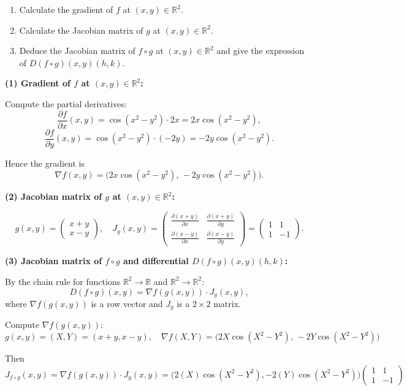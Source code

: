 \documentclass[12pt]{article}
\begin{document}
\begin{enumerate}
    \item Calculate the gradient of $f$ at $(x, y) \in \mathbb{R}^2$.
    \item Calculate the Jacobian matrix of $g$ at $(x, y) \in \mathbb{R}^2$.
    \item Deduce the Jacobian matrix of $f \circ g$ at $(x, y) \in \mathbb{R}^2$ and give the expression of $D(f \circ g)(x, y)(h, k)$.
\end{enumerate}

\begin{correctionbox}
\textbf{(1) Gradient of \(f\) at \((x,y)\in\mathbb{R}^2\):}

Compute the partial derivatives:
\[
\frac{\partial f}{\partial x}(x,y)=\cos(x^2-y^2)\cdot 2x = 2x\cos(x^2-y^2),
\]
\[
\frac{\partial f}{\partial y}(x,y)=\cos(x^2-y^2)\cdot (-2y) = -2y\cos(x^2-y^2).
\]

Hence the gradient is
\[
\boxed{\nabla f(x,y) = \big(2x\cos(x^2-y^2),\, -2y\cos(x^2-y^2)\big)}.
\]

\medskip
\textbf{(2) Jacobian matrix of \(g\) at \((x,y)\in\mathbb{R}^2\):}

\[
g(x,y) = \begin{pmatrix} x+y \\ x-y \end{pmatrix},\quad
J_g(x,y) = 
\begin{pmatrix}
\frac{\partial (x+y)}{\partial x} & \frac{\partial (x+y)}{\partial y} \\
\frac{\partial (x-y)}{\partial x} & \frac{\partial (x-y)}{\partial y} 
\end{pmatrix}
=
\begin{pmatrix}
1 & 1 \\
1 & -1
\end{pmatrix}.
\]

\medskip
\textbf{(3) Jacobian matrix of \(f\circ g\) and differential \(D(f\circ g)(x,y)(h,k)\):}

By the chain rule for functions \(\mathbb{R}^2\to\mathbb{R}\) and \(\mathbb{R}^2\to\mathbb{R}^2\):
\[
D(f\circ g)(x,y) = \nabla f(g(x,y)) \cdot J_g(x,y),
\]
where \(\nabla f(g(x,y))\) is a row vector and \(J_g\) is a \(2\times2\) matrix.

\medskip
Compute \(\nabla f(g(x,y))\):
\[
g(x,y)=(X,Y)=(x+y,x-y),\quad
\nabla f(X,Y) = \big(2X \cos(X^2-Y^2),\, -2Y \cos(X^2-Y^2)\big)
\]

Then
\[
J_{f\circ g}(x,y) = \nabla f(g(x,y)) \cdot J_g(x,y)
= \big(2(X)\cos(X^2-Y^2), -2(Y)\cos(X^2-Y^2)\big)
\begin{pmatrix}1 & 1 \\ 1 & -1\end{pmatrix}
\]


\end{correctionbox}
\end{document}
